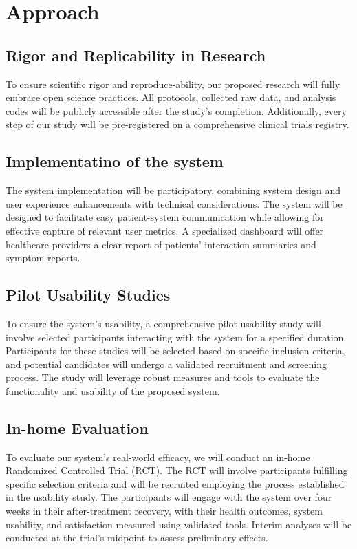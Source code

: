 \documentclass[11pt]{article}
\begin{document}
\section{Approach}

\subsection{Rigor and Replicability in Research}

To ensure scientific rigor and reproduce-ability, our proposed research will fully embrace open science practices. All protocols, collected raw data, and analysis codes will be publicly accessible after the study's completion. Additionally, every step of our study will be pre-registered on a comprehensive clinical trials registry.

\subsection{Implementatino of the system}

The system implementation will be participatory, combining system design and user experience enhancements with technical considerations. The system will be designed to facilitate easy patient-system communication while allowing for effective capture of relevant user metrics. A specialized dashboard will offer healthcare providers a clear report of patients' interaction summaries and symptom reports.

\subsection{Pilot Usability Studies}

To ensure the system's usability, a comprehensive pilot usability study will involve selected participants interacting with the system for a specified duration. Participants for these studies will be selected based on specific inclusion criteria, and potential candidates will undergo a validated recruitment and screening process. The study will leverage robust measures and tools to evaluate the functionality and usability of the proposed system.

\subsection{In-home Evaluation}

To evaluate our system's real-world efficacy, we will conduct an in-home Randomized Controlled Trial (RCT). The RCT will involve participants fulfilling specific selection criteria and will be recruited employing the process established in the usability study. The participants will engage with the system over four weeks in their after-treatment recovery, with their health outcomes, system usability, and satisfaction measured using validated tools. Interim analyses will be conducted at the trial's midpoint to assess preliminary effects.

\clearpage
\appendix


\end{document}
